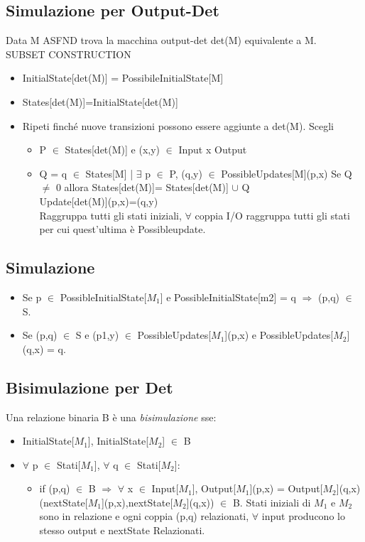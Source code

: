 \documentclass[a4paper]{article}
\begin{document}
\subsection{Simulazione per Output-Det}Data M ASFND trova la macchina output-det det(M) equivalente a M.\\ SUBSET CONSTRUCTION 
\begin{itemize}
\item InitialState[det(M)] = PossibileInitialState[M]
\item States[det(M)]={InitialState[det(M)]}
\item Ripeti finché nuove transizioni possono essere aggiunte a det(M). Scegli
\begin{itemize}
\item P $\in$ States[det(M)] e (x,y) $\in$ Input x Output
\item Q = {q $\in$ States[M] | $\exists$ p $\in$ P, (q,y) $\in$ PossibleUpdates[M](p,x)}
Se Q $\ne$ 0 allora States[det(M)]= States[det(M)] $\cup$ {Q}\\
Update[det(M)](p,x)=(q,y)\\
Raggruppa tutti gli stati iniziali, $\forall$ coppia I/O raggruppa tutti gli stati per cui quest'ultima è Possibleupdate.
\end{itemize}
\end{itemize}
\subsection{Simulazione}
\begin{itemize}
\item Se p $\in$ PossibleInitialState[$M_1$] e PossibleInitialState[m2] = {q} $\Rightarrow$ (p,q) $\in$ S.
\item Se (p,q) $\in$ S e (p1,y) $\in$ PossibleUpdates[$M_1$](p,x) e PossibleUpdates[$M_2$](q,x) = {q}. 
\end{itemize}
\subsection{Bisimulazione per Det} Una relazione binaria B è una \emph{bisimulazione} sse:
\begin{itemize}
\item InitialState[$M_1$], InitialState[$M_2$] $\in$ B 
\item $\forall$ p $\in$ Stati[$M_1$], $\forall$ q $\in$ Stati[$M_2$]:
\begin{itemize}
\item if (p,q) $\in$ B $\Rightarrow$ $\forall$ x $\in$ Input[$M_1$], Output[$M_1$](p,x) = Output[$M_2$](q,x)\\
(nextState[$M_1$](p,x),nextState[$M_2$](q,x)) $\in$ B.
Stati iniziali di $M_1$ e $M_2$ sono in relazione e ogni coppia (p,q) relazionati, $\forall$ input producono lo stesso output e nextState Relazionati.
\end{itemize}
\end{itemize}
\end{document}
